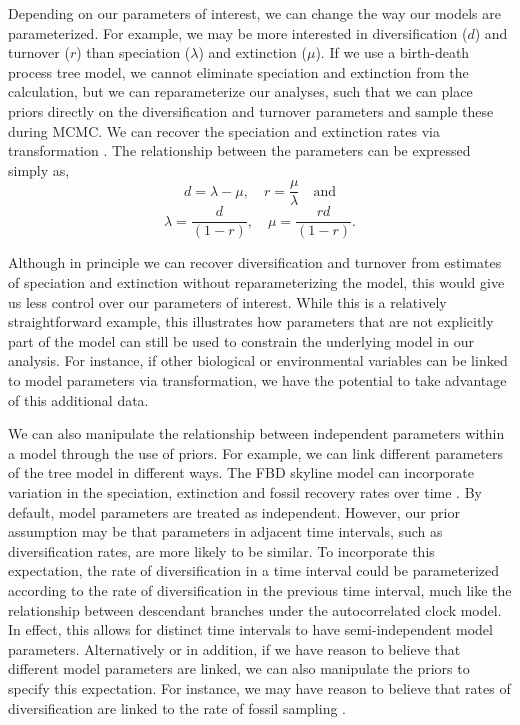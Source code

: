 Depending on our parameters of interest, we can change the way our models are parameterized.
For example, we may be more interested in diversification ($d$) and turnover ($r$) than speciation ($\lambda$) and extinction ($\mu$).
If we use a birth-death process tree model, we cannot eliminate speciation and extinction from the calculation, but we can reparameterize our analyses, such that we can place priors directly on the diversification and turnover parameters and sample these during MCMC. We can recover the speciation and extinction rates via transformation \citep{Heath2014}.
The relationship between the parameters can be expressed simply as,
$$d = \lambda - \mu, \quad r = \frac{\mu}{\lambda} \quad \textrm{and} $$
$$\lambda = \frac{d}{(1-r)}, \quad \mu = \frac{rd}{(1 - r)}.$$

Although in principle we can recover diversification and turnover from estimates of speciation and extinction without reparameterizing the model, this would give us less control over our parameters of interest.
While this is a relatively straightforward example, this illustrates how parameters that are not explicitly part of the model can still be used to constrain the underlying model in our analysis.
For instance, if other biological or environmental variables %
can be linked to model parameters via transformation, we have the potential to take advantage of this additional data.

We can also manipulate the relationship between independent parameters within a model through the use of priors.
For example, we can link different parameters of the tree model in different ways.
The FBD skyline model can incorporate variation in the speciation, extinction and fossil recovery rates over time \citep{Gavryushkina2014,Zhang2016}.
By default, model parameters are treated as independent.
However, our prior assumption may be that parameters in adjacent time intervals, such as diversification rates, are more likely to be similar.
To incorporate this expectation, the rate of diversification in a time interval could be parameterized according to the rate of diversification in the previous time interval, much like the relationship between descendant branches under the autocorrelated  clock model.
In effect, this allows for distinct time intervals to have semi-independent model parameters.
Alternatively or in addition, if we have reason to believe that different model parameters are linked, we can also manipulate the priors to specify this expectation.
For instance, we may have reason to believe that rates of diversification are linked to the rate of fossil sampling \citep{Holland1995,Peters2005}.


